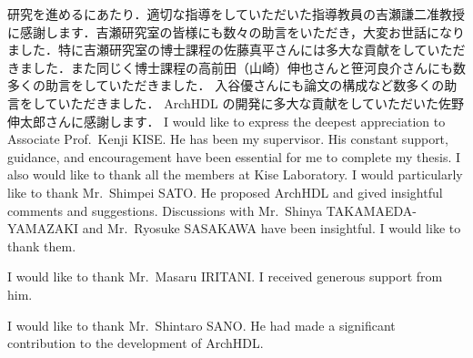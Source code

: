 研究を進めるにあたり．適切な指導をしていただいた指導教員の吉瀬謙二准教授に感謝します．吉瀬研究室の皆様にも数々の助言をいただき，大変お世話になりました．特に吉瀬研究室の博士課程の佐藤真平さんには多大な貢献をしていただきました．また同じく博士課程の高前田（山崎）伸也さんと笹河良介さんにも数多くの助言をしていただきました．
入谷優さんにも論文の構成など数多くの助言をしていただきました．
ArchHDL の開発に多大な貢献をしていただいた佐野伸太郎さんに感謝します．
\fi
I would like to express the deepest appreciation to Associate Prof.~Kenji KISE.\@
He has been my supervisor. His constant support, guidance, and encouragement have been essential for me to complete my thesis.
I also would like to thank all the members at Kise Laboratory.
I would particularly like to thank Mr.~Shimpei SATO.\@
He proposed ArchHDL and gived insightful comments and suggestions.
Discussions with Mr.~Shinya TAKAMAEDA-YAMAZAKI and Mr.~Ryosuke SASAKAWA have been insightful. I would like to thank them.

I would like to thank Mr.~Masaru IRITANI.\@
I received generous support from him.

I would like to thank Mr.~Shintaro SANO.\@
He had made a significant contribution to the development of ArchHDL.
